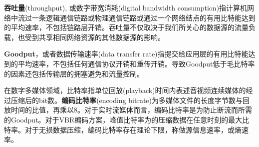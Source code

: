 \textbf{吞吐量}(throughput), 或数字带宽消耗(digital bandwidth consumption)指计算机网络中流过一条逻辑通信链路或物理通信链路或通过一个网络结点的有用比特能达到的平均速率，不包括链路层开销。吞吐量不仅取决于我们所关心的数据源的流量负载，也受到共享相同网络资源的其他数据源的影响。

\textbf{Goodput}，或者数据传输速率(data transfer rate)指提交给应用层的有用比特能达到的平均速率，不包括任何通信协议开销和重传开销。导致Goodput低于毛比特率的因素还包括传输层的拥塞避免和流量控制。

在数字多媒体领域，比特率指单位回放(playback)时间内表述音视频连续媒体的经过压缩后的bit数。\textbf{编码比特率}(encoding bitrate)为多媒体文件的长度字节数与回放时间的比值，再乘以8。对于实时流媒体而言，编码比特率是为防止断流而所需的Goodput。对于VBR编码方案，峰值比特率为的压缩数据在任意时刻的最大比特率。对于无损数据压缩，编码比特率存在理论下限，称做源信息速率，或熵速率。






